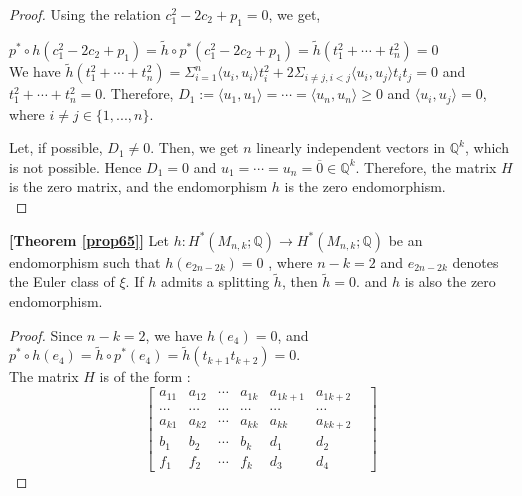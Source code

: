 \documentclass[a4paper,leqno,12pt]{amsart}
\theoremstyle{plain}
\theoremstyle{definition}
\theoremstyle{remark}
\newcommand{\Q}{\mathbb{Q}}
\begin{document}
{\begin{proof}
\noindent
Using the relation $c_{1}^{2}-2c_{2}+p_{1}=0$,  we get, 

$p^{*}\circ h(c_{1}^{2}-2c_{2}+p_{1})= \widetilde{h}\circ p^{*}(c_{1}^{2}-2c_{2}+p_{1})= \widetilde{h}(t_{1}^{2}+ \cdots +t_{n}^{2})=0$ \\
\noindent
We have  $\widetilde{h}(t_{1}^{2}+ \cdots +t_{n}^{2})= \Sigma_{i=1}^{n}\langle u_{i},u_{i}\rangle t_{i}^{2} + 2 \Sigma_{i\neq j , i< j}\langle u_{i}, u_{j}\rangle t_{i}t_{j}=0$
and $t_{1}^{2}+ \cdots +t_{n}^{2}=0$.  
Therefore,  $D_{1} :=   \langle u_{1}, u_{1} \rangle = \cdots = \langle u_{n},u_{n}\rangle  \geq 0$ 
and $\langle u_{i}, u_{j} \rangle = 0$,   where $i \neq j \in \{ 1,...,n\}.$

 

\noindent
Let,  if possible,  $D_{1} \neq 0$.  Then,  we get $n$ linearly independent vectors in $\Q^{k}$,  which is not possible.  Hence $D_{1}=0$ and $u_{1}= \cdots =u_{n}=\overline{0} \in \Q^{k}$.  Therefore,  the matrix $H$ is the zero matrix,  and the endomorphism $h$ is the zero endomorphism. \\
\end{proof}


\begin{myprop}  {\bf [Theorem \ref{prop65}]}  %
Let $h:H^{*}(M_{n,k}; \Q) \to H^{*}(M_{n,k}; \Q)$  be an endomorphism  such that $h(e_{2n-2k})=0$ , where $n-k=2$ and $e_{2n-2k}$ denotes the Euler class of $\xi$.   If $h$ admits a splitting $\widetilde{h}$,   then $\widetilde{h} =0$.  and $h$ is also the zero endomorphism. 
\end{myprop}

\begin{proof}
Since $n-k =2$,  we have $h(e_{4})=0$,  and 
$p^{*}\circ h(e_{4})= \widetilde{h}\circ p^{*}(e_{4})= \widetilde{h}(t_{k+1}t_{k+2})=0$.\\

\noindent
The matrix $H$ is  of the form : 
\begin{equation}
\begin{bmatrix}
 a_{11} & a_{12} & \cdots & a_{1k} & a_{1k+1} &  a_{1k+2} \\
 \cdots &  \cdots & \cdots & \cdots &  \cdots & \cdots &   \\
 a_{k1}  &  a_{k2} & \cdots &  a_{kk} &  a_{kk} & a_{kk+2} \\
  b_{1}  &  b_{2} & \cdots &  b_{k} &   d_{1}  &   d_{2} \\
  f_{1}  &  f_{2} & \cdots &  f_{k} &   d_{3} &   d_{4}
\end{bmatrix} 
\end{equation}


\end{proof}}
\end{document}
